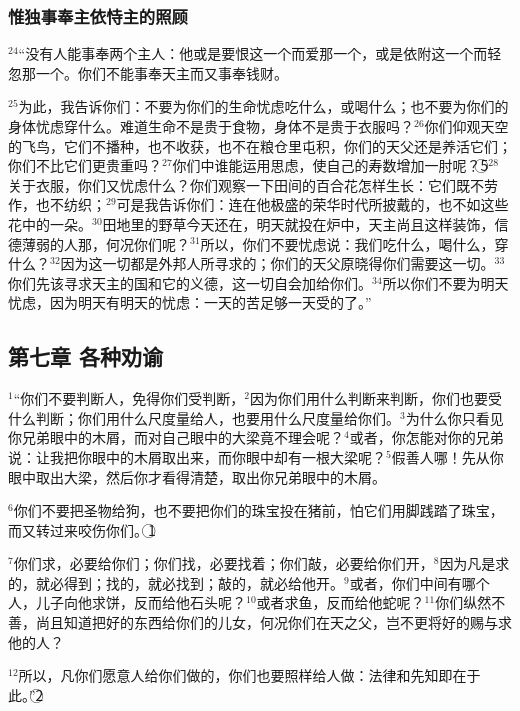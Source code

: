 \subsubsection{惟独事奉主依恃主的照顾}
$^{24}$“没有人能事奉两个主人：他或是要恨这一个而爱那一个，或是依附这一个而轻忽那一个。你们不能事奉天主而又事奉钱财。

$^{25}$为此，我告诉你们：不要为你们的生命忧虑吃什么，或喝什么；也不要为你们的身体忧虑穿什么。难道生命不是贵于食物，身体不是贵于衣服吗？$^{26}$你们仰观天空的飞鸟，它们不播种，也不收获，也不在粮仓里屯积，你们的天父还是养活它们；你们不比它们更贵重吗？$^{27}$你们中谁能运用思虑，使自己的寿数增加一肘呢？\textcircled{5}$^{28}$关于衣服，你们又忧虑什么？你们观察一下田间的百合花怎样生长：它们既不劳作，也不纺织；$^{29}$可是我告诉你们：连\UL[撒罗满]在他极盛的荣华时代所披戴的，也不如这些花中的一朵。$^{30}$田地里的野草今天还在，明天就投在炉中，天主尚且这样装饰，信德薄弱的人那，何况你们呢？$^{31}$所以，你们不要忧虑说：我们吃什么，喝什么，穿什么？$^{32}$因为这一切都是外邦人所寻求的；你们的天父原晓得你们需要这一切。$^{33}$你们先该寻求天主的国和它的义德，这一切自会加给你们。$^{34}$所以你们不要为明天忧虑，因为明天有明天的忧虑：一天的苦足够一天受的了。”


\subsection{第七章 各种劝谕}
$^{1}$“你们不要判断人，免得你们受判断，$^{2}$因为你们用什么判断来判断，你们也要受什么判断；你们用什么尺度量给人，也要用什么尺度量给你们。$^{3}$为什么你只看见你兄弟眼中的木屑，而对自己眼中的大梁竟不理会呢？$^{4}$或者，你怎能对你的兄弟说：让我把你眼中的木屑取出来，而你眼中却有一根大梁呢？$^{5}$假善人哪！先从你眼中取出大梁，然后你才看得清楚，取出你兄弟眼中的木屑。

$^{6}$你们不要把圣物给狗，也不要把你们的珠宝投在猪前，怕它们用脚践踏了珠宝，而又转过来咬伤你们。\textcircled{1}

$^{7}$你们求，必要给你们；你们找，必要找着；你们敲，必要给你们开，$^{8}$因为凡是求的，就必得到；找的，就必找到；敲的，就必给他开。$^{9}$或者，你们中间有哪个人，儿子向他求饼，反而给他石头呢？$^{10}$或者求鱼，反而给他蛇呢？$^{11}$你们纵然不善，尚且知道把好的东西给你们的儿女，何况你们在天之父，岂不更将好的赐与求他的人？

$^{12}$所以，凡你们愿意人给你们做的，你们也要照样给人做：法律和先知即在于此。”\textcircled{2}


